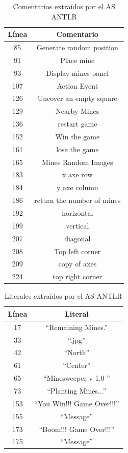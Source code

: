 \begin{table}[ht!]
{		\centering
   		\begin{tabular}{| c | c |}  
       \hline
\textbf{Línea} & \textbf{Comentario} \\ \hline
85&Generate random position \\ \hline
91&Place mine \\ \hline
93&Display mines panel \\ \hline
107&Action Event \\ \hline
126&Uncover an empty square \\ \hline
129&Nearby Mines \\ \hline
136&restart game \\ \hline
152&Win the game \\ \hline
161&lose the game \\ \hline
165&Mines Random Images \\ \hline
183&x axe row \\ \hline
184&y axe column \\ \hline
186&return the number of mines \\ \hline
192&horizontal \\ \hline
199&vertical \\ \hline
207&diagonal \\ \hline
208&Top left corner \\ \hline
209&copy of axes \\ \hline
224&top right corner \\ \hline
\end{tabular}
}
\caption{Comentarios extraídos por el AS ANTLR}\label{tabla3}
\end{table}


\begin{table}[h!]
	
		\centering
   		\begin{tabular}{| c | c |}      
       \hline
  	   \textbf{Línea} & \textbf{Literal} \\ \hline
17&“Remaining Mines.” \\ \hline
33&“.jpg”  \\ \hline
42&“North”  \\ \hline
61&“Center”  \\ \hline
65&“Minesweeper v 1.0 ”  \\ \hline
73&“Planting Mines...”  \\ \hline
153&“You Win!!! Game Over!!!” \\ \hline
155&“Message” \\ \hline
173&“Boom!!! Game Over!!!” \\ \hline
175&“Message” \\ \hline
  \end{tabular} 
	 
   \caption{Literales extraídos por el AS ANTLR}
   \label{tabla4}
     
\end{table} 

